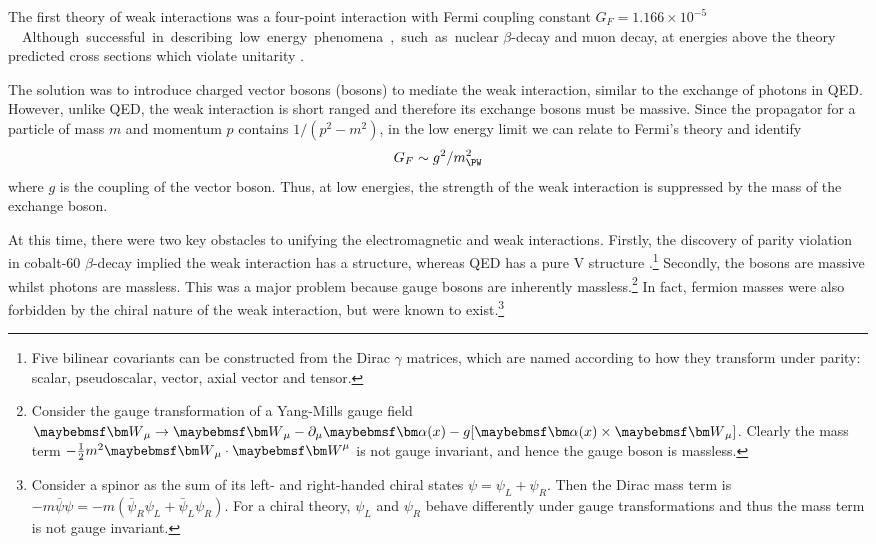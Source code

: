 
The first theory of weak interactions was a four-point interaction with Fermi coupling 
constant \unit{$G_F = 1.166\times 10^{-5}$}{\GeV\rpsquared}. Although successful in 
describing low energy phenomena, such as nuclear $\beta$-decay and muon decay, at 
energies above \unit{}{\GeV} the theory predicted cross sections which violate 
unitarity \cite{Aitchison}.

The solution was to introduce charged vector bosons (\PWpm bosons) to mediate the weak 
interaction, similar to the exchange of photons in \ac{QED}. However, unlike \ac{QED}, 
the weak interaction is short ranged and therefore its exchange bosons must be massive. 
Since the propagator for a particle of mass $m$ and momentum $p$ contains 
$1 / (p^2 - m^2)$, in the low energy limit we can relate to Fermi's theory and identify
\begin{equation}
	G_F \sim g^2 / m_{\PW}^2
\end{equation}
where $g$ is the coupling of the vector boson. Thus, at low energies, the strength of the weak interaction is suppressed by the mass of the exchange boson.

At this time, there were two key obstacles to unifying the electromagnetic and weak 
interactions. Firstly, the discovery of parity violation in cobalt-60 $\beta$-decay 
implied the weak interaction has a \VminusA structure, whereas \ac{QED} has a pure V 
structure \cite{Wu:1957}.\footnote{
	Five bilinear covariants can be constructed from the Dirac $\gamma$ matrices, which 
	are named according to how they transform under parity: scalar, pseudoscalar, vector, 
	axial vector and tensor.
}
Secondly, the \PWpm bosons are massive whilst photons are massless. This was a major problem because gauge bosons are inherently massless.\footnote{
	Consider the gauge transformation of a Yang-Mills gauge field 
	$\bvec{W}_{\mu} \rightarrow \bvec{W}_{\mu} - \partial_{\mu} \bvec{\alpha}(x)
	- g \lbrack \bvec{\alpha}(x) \times \bvec{W}_{\mu} \rbrack$. Clearly the mass term 
	$-\tfrac{1}{2}m^2 \bvec{W}_{\mu} \cdot \bvec{W}^{\mu}$ is not gauge invariant, and 
	hence the gauge boson is massless.}
In fact, fermion masses were also forbidden by the chiral nature of the weak interaction, 
but were known to exist.\footnote{
	Consider a spinor as the sum of its left- and right-handed chiral states 
	$\psi = \psi_L + \psi_R$. Then the Dirac mass term is $-m \bar{\psi} \psi = 
	-m (\bar{\psi}_R \psi_L + \bar{\psi}_L \psi_R)$. For a chiral theory, $\psi_L$ and
	$\psi_R$ behave differently under gauge transformations and thus the mass term is not gauge invariant.
}

